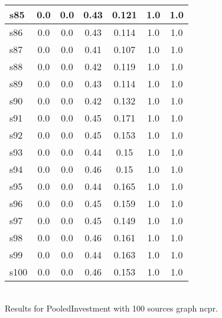 \documentclass{article}
\begin{document}
\begin{tabular}{|l|c|c|c|c|c|c|}
\hline
s85 &0.0 & 0.0 & 0.43 & 0.121 & 1.0 & 1.0\\
\hline
s86 &0.0 & 0.0 & 0.43 & 0.114 & 1.0 & 1.0\\
\hline
s87 &0.0 & 0.0 & 0.41 & 0.107 & 1.0 & 1.0\\
\hline
s88 &0.0 & 0.0 & 0.42 & 0.119 & 1.0 & 1.0\\
\hline
s89 &0.0 & 0.0 & 0.43 & 0.114 & 1.0 & 1.0\\
\hline
s90 &0.0 & 0.0 & 0.42 & 0.132 & 1.0 & 1.0\\
\hline
s91 &0.0 & 0.0 & 0.45 & 0.171 & 1.0 & 1.0\\
\hline
s92 &0.0 & 0.0 & 0.45 & 0.153 & 1.0 & 1.0\\
\hline
s93 &0.0 & 0.0 & 0.44 & 0.15 & 1.0 & 1.0\\
\hline
s94 &0.0 & 0.0 & 0.46 & 0.15 & 1.0 & 1.0\\
\hline
s95 &0.0 & 0.0 & 0.44 & 0.165 & 1.0 & 1.0\\
\hline
s96 &0.0 & 0.0 & 0.45 & 0.159 & 1.0 & 1.0\\
\hline
s97 &0.0 & 0.0 & 0.45 & 0.149 & 1.0 & 1.0\\
\hline
s98 &0.0 & 0.0 & 0.46 & 0.161 & 1.0 & 1.0\\
\hline
s99 &0.0 & 0.0 & 0.44 & 0.163 & 1.0 & 1.0\\
\hline
s100 &0.0 & 0.0 & 0.46 & 0.153 & 1.0 & 1.0\\
\hline
\end{tabular}\\

\noindent Results for PooledInvestment with 100 sources graph ncpr.
\end{document}
